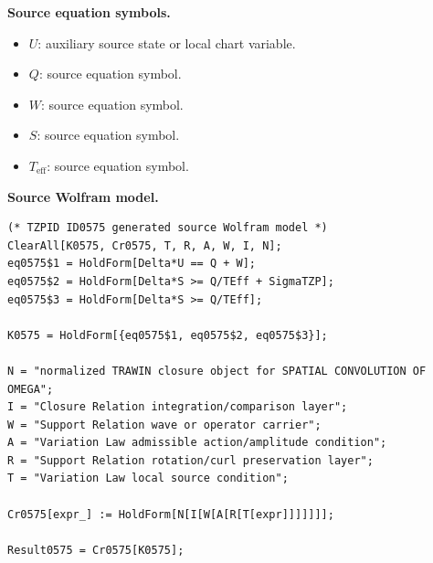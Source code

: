 \begin{minipage}[t]{0.49\linewidth}
\begingroup
\small
\raggedright
\textbf{Source equation symbols.}\par
\begin{itemize}[leftmargin=1.35em,itemsep=1pt,topsep=1pt,parsep=0pt]
    \item $U$: auxiliary source state or local chart variable.
    \item $Q$: source equation symbol.
    \item $W$: source equation symbol.
    \item $S$: source equation symbol.
    \item $T_{\mathrm{eff}}$: source equation symbol.
\end{itemize}
\endgroup
\end{minipage}\hfill
\begin{minipage}[t]{0.47\linewidth}
\begingroup
\scriptsize
\raggedright
\textbf{Source Wolfram model.}\par
\begin{Verbatim}[fontsize=\tiny,breaklines=true,breakanywhere=true]
(* TZPID ID0575 generated source Wolfram model *)
ClearAll[K0575, Cr0575, T, R, A, W, I, N];
eq0575$1 = HoldForm[Delta*U == Q + W];
eq0575$2 = HoldForm[Delta*S >= Q/TEff + SigmaTZP];
eq0575$3 = HoldForm[Delta*S >= Q/TEff];

K0575 = HoldForm[{eq0575$1, eq0575$2, eq0575$3}];

N = "normalized TRAWIN closure object for SPATIAL CONVOLUTION OF OMEGA";
I = "Closure Relation integration/comparison layer";
W = "Support Relation wave or operator carrier";
A = "Variation Law admissible action/amplitude condition";
R = "Support Relation rotation/curl preservation layer";
T = "Variation Law local source condition";

Cr0575[expr_] := HoldForm[N[I[W[A[R[T[expr]]]]]]];

Result0575 = Cr0575[K0575];
\end{Verbatim}
\endgroup
\end{minipage}


